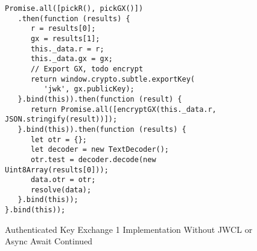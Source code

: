 \begin{figure}[!htbp]
\centering
 \begin{lstlisting}[basicstyle=\small]
Promise.all([pickR(), pickGX()])
   .then(function (results) {
      r = results[0];
      gx = results[1];
      this._data.r = r;
      this._data.gx = gx;
      // Export GX, todo encrypt 
      return window.crypto.subtle.exportKey(
         'jwk', gx.publicKey);
   }.bind(this)).then(function (result) {
      return Promise.all([encryptGX(this._data.r, JSON.stringify(result))]);
   }.bind(this)).then(function (results) {
      let otr = {};
      let decoder = new TextDecoder();
      otr.test = decoder.decode(new Uint8Array(results[0])); 
      data.otr = otr;
      resolve(data);
   }.bind(this));
}.bind(this));
 \end{lstlisting}
  \caption{Authenticated Key Exchange 1 Implementation Without JWCL or Async Await Continued}
\label{fig:ake1njaactd}
\end{figure}

